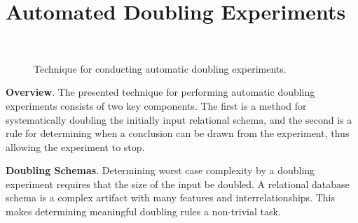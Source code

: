 
\vspace*{-.035in}
\section{Automated Doubling Experiments}\label{sec:technique}
\vspace*{-.035in}

  \begin{figure*}
    
    \caption{Technique for conducting automatic doubling experiments.}~\label{fig:doublingexp}
  \end{figure*}


  {\bf Overview}. The presented technique for performing automatic doubling experiments consists of two key components.
  The first is a method for systematically doubling the initially input relational schema, and the second is a rule for
  determining when a conclusion can be drawn from the experiment, thus allowing the experiment to stop.

  \textbf{Doubling Schemas}. Determining worst case complexity by a doubling experiment requires that the size of the
  input be doubled. A relational database schema is a complex artifact with many features and interrelationships.  This
  makes determining meaningful doubling rules a non-trivial task.

